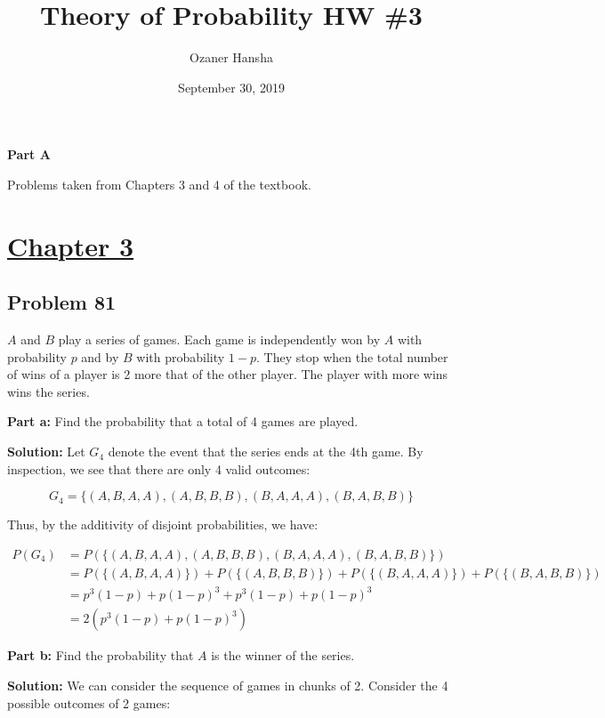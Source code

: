 \documentclass{article}
\begin{document}
\title{Theory of Probability HW \#3}
\author{Ozaner Hansha}
\date{September 30, 2019}
\maketitle

\begin{center}
    \Large{\textbf{Part A}}
\end{center}
Problems taken from Chapters 3 and 4 of the textbook.

\section*{\underline{Chapter 3}}

\subsection*{Problem 81}
$A$ and $B$ play a series of games. Each game is independently won by $A$ with probability $p$ and by $B$ with probability $1-p$. They stop when the total number of wins of a player is 2 more that of the other player. The player with more wins wins the series.
\bigskip

\noindent\textbf{Part a:} Find the probability that a total of 4 games are played.
\bigskip

\noindent\textbf{Solution:} Let $G_4$ denote the event that the series ends at the 4th game. By inspection, we see that there are only 4 valid outcomes:

\begin{equation*}
    G_4=\{(A,B,A,A),(A,B,B,B),(B,A,A,A),(B,A,B,B)\}
\end{equation*}

Thus, by the additivity of disjoint probabilities, we have:

\begin{align*}
    P(G_4)&=P(\{(A,B,A,A),(A,B,B,B),(B,A,A,A),(B,A,B,B)\})\\
    &=P(\{(A,B,A,A)\})+P(\{(A,B,B,B)\})+P(\{(B,A,A,A)\})+P(\{(B,A,B,B)\})\\
    &=p^3(1-p)+p(1-p)^3+p^3(1-p)+p(1-p)^3\\
    &=2(p^3(1-p)+p(1-p)^3)
\end{align*}

\bigskip

\noindent\textbf{Part b:} Find the probability that $A$ is the winner of the series.
\bigskip

\noindent\textbf{Solution:} We can consider the sequence of games in chunks of 2. Consider the 4 possible outcomes of 2 games:
\end{document}
